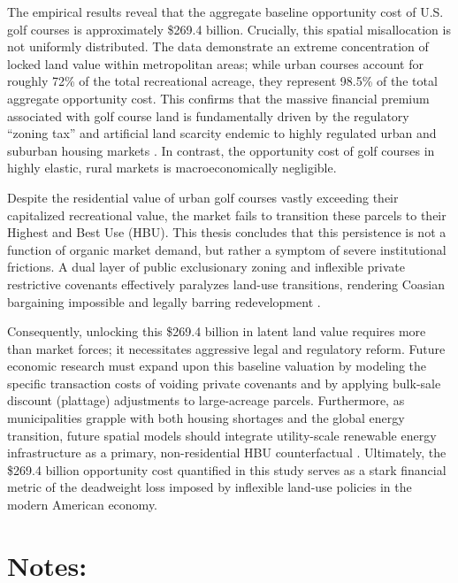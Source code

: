 \documentclass[10pt, letterpaper]{article}
\begin{document}
The empirical results reveal that the aggregate baseline opportunity cost of U.S. golf courses is approximately \$269.4 billion. Crucially, this spatial misallocation is not uniformly distributed. The data demonstrate an extreme concentration of locked land value within metropolitan areas; while urban courses account for roughly 72\% of the total recreational acreage, they represent 98.5\% of the total aggregate opportunity cost. This confirms that the massive financial premium associated with golf course land is fundamentally driven by the regulatory ``zoning tax'' and artificial land scarcity endemic to highly regulated urban and suburban housing markets \parencite{Glaeser2005, Davis2021}. In contrast, the opportunity cost of golf courses in highly elastic, rural markets is macroeconomically negligible.

Despite the residential value of urban golf courses vastly exceeding their capitalized recreational value, the market fails to transition these parcels to their Highest and Best Use (HBU). This thesis concludes that this persistence is not a function of organic market demand, but rather a symptom of severe institutional frictions. A dual layer of public exclusionary zoning and inflexible private restrictive covenants effectively paralyzes land-use transitions, rendering Coasian bargaining impossible and legally barring redevelopment \parencite{Coase1960, Ellickson2022, Korngold2024}. 

Consequently, unlocking this \$269.4 billion in latent land value requires more than market forces; it necessitates aggressive legal and regulatory reform. Future economic research must expand upon this baseline valuation by modeling the specific transaction costs of voiding private covenants and by applying bulk-sale discount (plattage) adjustments to large-acreage parcels. Furthermore, as municipalities grapple with both housing shortages and the global energy transition, future spatial models should integrate utility-scale renewable energy infrastructure as a primary, non-residential HBU counterfactual \parencite{Weinand2025}. Ultimately, the \$269.4 billion opportunity cost quantified in this study serves as a stark financial metric of the deadweight loss imposed by inflexible land-use policies in the modern American economy.

\newpage

\printbibliography[title={References}]

\newpage
\section*{Notes:}
\end{document}
